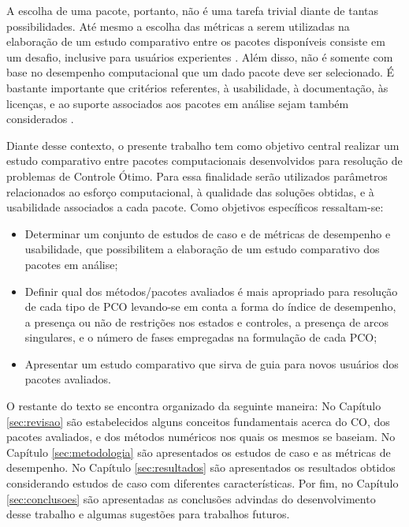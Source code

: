 
A escolha de uma pacote, portanto, não é uma tarefa trivial diante de tantas possibilidades. Até mesmo a escolha das métricas a serem utilizadas na elaboração de um estudo comparativo entre os pacotes disponíveis consiste em um desafio, inclusive para usuários experientes \cite{bongartz_numerical_1997}. Além disso, não é somente com base no desempenho computacional que um dado pacote deve ser selecionado. É bastante importante que critérios referentes, à usabilidade, à documentação, às licenças, e ao suporte associados aos pacotes em análise sejam também considerados \cite{parejo_metaheuristic_2012}. 


Diante desse contexto, o presente trabalho tem como objetivo central realizar um estudo comparativo entre pacotes computacionais desenvolvidos para resolução de problemas de Controle Ótimo. Para essa finalidade serão utilizados parâmetros relacionados ao esforço computacional, à qualidade das soluções obtidas, e à usabilidade associados a cada pacote. Como objetivos específicos ressaltam-se:	

\begin{itemize}
	\item Determinar um conjunto de estudos de caso e de métricas de desempenho e usabilidade, que possibilitem a elaboração de um estudo comparativo dos pacotes em análise;
	
	\item Definir qual dos métodos/pacotes avaliados é mais apropriado para resolução de cada tipo de PCO levando-se em conta a forma do índice de desempenho, a presença ou não de restrições nos estados e controles, a presença de arcos singulares, e o número de fases empregadas na formulação de cada PCO;
	
	\item Apresentar um estudo comparativo que sirva de guia para novos usuários dos pacotes avaliados.
\end{itemize}


O restante do texto se encontra organizado da seguinte maneira: No Capítulo \ref{sec:revisao} são estabelecidos alguns conceitos fundamentais acerca do CO, dos pacotes avaliados, e dos métodos numéricos nos quais os mesmos se baseiam. No Capítulo \ref{sec:metodologia} são apresentados os estudos de caso e as métricas de desempenho. No Capítulo \ref{sec:resultados} são apresentados os resultados obtidos considerando estudos de caso com diferentes características. Por fim, no Capítulo \ref{sec:conclusoes} são apresentadas as conclusões advindas do desenvolvimento desse trabalho e algumas sugestões para trabalhos futuros.  